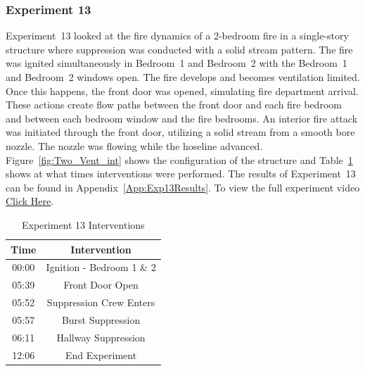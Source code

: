 \documentclass[12pt,oneside]{book}
\begin{document}
\FloatBarrier

\subsubsection{Experiment 13}
Experiment~13 looked at the fire dynamics of a 2-bedroom fire in a single-story structure where suppression was conducted with a solid stream pattern. The fire was ignited simultaneously in Bedroom~1 and Bedroom~2 with the Bedroom~1 and Bedroom~2 windows open. The fire develops and becomes ventilation limited. Once this happens, the front door was opened, simulating fire department arrival. These actions create flow paths between the front door and each fire bedroom and between each bedroom window and the fire bedrooms. An interior fire attack was initiated through the front door, utilizing a solid stream from a smooth bore nozzle. The nozzle was flowing while the hoseline advanced. Figure~\ref{fig:Two_Vent_int} shows the configuration of the structure and Table~\ref{Table:Exp13Interventions} shows at what times interventions were performed. The results of Experiment~13 can be found in Appendix~\ref{App:Exp13Results}. To view the full experiment video \href{https://player.vimeo.com/video/170499618?autoplay=1}{Click Here}.

\begin{table}[H]
	\centering
	\caption{Experiment 13 Interventions}
	\begin{tabular}{|c|c|} 
		\hline
		Time & Intervention \\ \hline \hline
		00:00 & Ignition - Bedroom 1 \& 2 \\ \hline
		05:39 & Front Door Open \\ \hline
		05:52 & Suppression Crew Enters\\ \hline
		05:57 & Burst Suppression \\ \hline 
		06:11 & Hallway Suppression \\ \hline
		12:06 & End Experiment\\ \hline
	\end{tabular}
	\label{Table:Exp13Interventions}
\end{table}

\FloatBarrier
\end{document}
